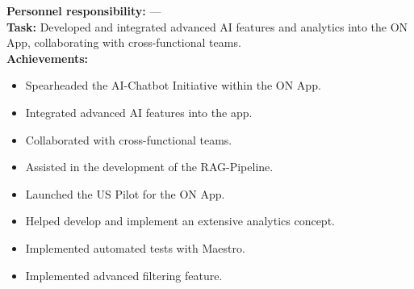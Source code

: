 \documentclass[10pt,a4paper,normalphoto]{altacv}
\begin{document}

\vspace{2em}

\textbf{Personnel responsibility:} —\\
\textbf{Task:} Developed and integrated advanced AI features and analytics into the ON App, collaborating with cross-functional teams.\\
\textbf{Achievements:}
\begin{itemize}
    \item Spearheaded the AI-Chatbot Initiative within the ON App.
    \item Integrated advanced AI features into the app.
    \item Collaborated with cross-functional teams.
    \item Assisted in the development of the RAG-Pipeline.
    \item Launched the US Pilot for the ON App.
    \item Helped develop and implement an extensive analytics concept.
    \item Implemented automated tests with Maestro.
    \item Implemented advanced filtering feature.
\end{itemize}


\vspace{1em}

\end{document}
